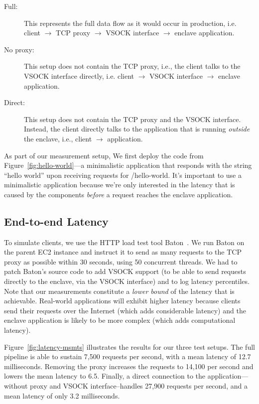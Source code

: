 \begin{description}
  \item[Full:] This represents the full data flow as it would occur in
    production, i.e. client $\rightarrow$ TCP proxy $\rightarrow$ VSOCK
    interface $\rightarrow$ enclave application.

  \item[No proxy:] This setup does not contain the TCP proxy, i.e., the client
    talks to the VSOCK interface directly, i.e. client $\rightarrow$ VSOCK
    interface $\rightarrow$ enclave application.

  \item[Direct:] This setup does not contain the TCP proxy and the VSOCK
    interface.  Instead, the client directly talks to the application that is
    running \emph{outside} the enclave, i.e., client $\rightarrow$ application.
\end{description}

As part of our measurement setup, We first deploy the code from
Figure~\ref{fig:hello-world}---a minimalistic application that responds with
the string ``hello world'' upon receiving requests for /hello-world.  It's
important to use a minimalistic application because we're only interested in
the latency that is caused by the components \emph{before} a request reaches
the enclave application.

\subsection{End-to-end Latency}
\label{sec:end-to-end}

To simulate clients, we use the HTTP load test tool Baton~\cite{baton}.  We run
Baton on the parent EC2 instance and instruct it to send as many requests to
the TCP proxy as possible within 30 seconds, using 50 concurrent threads.  We
had to patch Baton's source code to add VSOCK support (to be able to send
requests directly to the enclave, via the VSOCK interface) and to log latency
percentiles.  Note that our measurements constitute a \emph{lower bound} of the
latency that is achievable.  Real-world applications will exhibit higher
latency because clients send their requests over the Internet (which adds
considerable latency) and the enclave application is likely to be more complex
(which adds computational latency).

Figure~\ref{fig:latency-msmts} illustrates the results for our three test
setups.  The full pipeline is able to sustain 7,500 requests per second, with a
mean latency of 12.7 milliseconds.  Removing the proxy increases the requests
to 14,100 per second and lowers the mean latency to 6.5.  Finally, a direct
connection to the application---without proxy and VSOCK interface--handles
27,900 requests per second, and a mean latency of only 3.2 milliseconds.

